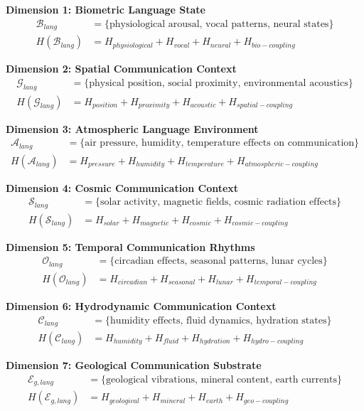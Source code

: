 \documentclass[12pt,a4paper]{article}
\begin{document}
\textbf{Dimension 1: Biometric Language State}
\begin{align}
\mathcal{B}_{lang} &= \{\text{physiological arousal, vocal patterns, neural states}\} \\
H(\mathcal{B}_{lang}) &= H_{physiological} + H_{vocal} + H_{neural} + H_{bio-coupling}
\end{align}

\textbf{Dimension 2: Spatial Communication Context}
\begin{align}
\mathcal{G}_{lang} &= \{\text{physical position, social proximity, environmental acoustics}\} \\
H(\mathcal{G}_{lang}) &= H_{position} + H_{proximity} + H_{acoustic} + H_{spatial-coupling}
\end{align}

\textbf{Dimension 3: Atmospheric Language Environment}
\begin{align}
\mathcal{A}_{lang} &= \{\text{air pressure, humidity, temperature effects on communication}\} \\
H(\mathcal{A}_{lang}) &= H_{pressure} + H_{humidity} + H_{temperature} + H_{atmospheric-coupling}
\end{align}

\textbf{Dimension 4: Cosmic Communication Context}
\begin{align}
\mathcal{S}_{lang} &= \{\text{solar activity, magnetic fields, cosmic radiation effects}\} \\
H(\mathcal{S}_{lang}) &= H_{solar} + H_{magnetic} + H_{cosmic} + H_{cosmic-coupling}
\end{align}

\textbf{Dimension 5: Temporal Communication Rhythms}
\begin{align}
\mathcal{O}_{lang} &= \{\text{circadian effects, seasonal patterns, lunar cycles}\} \\
H(\mathcal{O}_{lang}) &= H_{circadian} + H_{seasonal} + H_{lunar} + H_{temporal-coupling}
\end{align}

\textbf{Dimension 6: Hydrodynamic Communication Context}
\begin{align}
\mathcal{C}_{lang} &= \{\text{humidity effects, fluid dynamics, hydration states}\} \\
H(\mathcal{C}_{lang}) &= H_{humidity} + H_{fluid} + H_{hydration} + H_{hydro-coupling}
\end{align}

\textbf{Dimension 7: Geological Communication Substrate}
\begin{align}
\mathcal{E}_{g,lang} &= \{\text{geological vibrations, mineral content, earth currents}\} \\
H(\mathcal{E}_{g,lang}) &= H_{geological} + H_{mineral} + H_{earth} + H_{geo-coupling}
\end{align}
\end{document}
